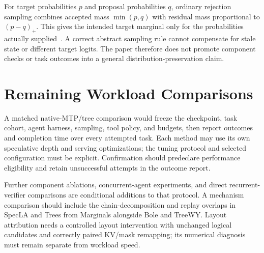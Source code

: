 \documentclass[conference]{IEEEtran}
\begin{document}
For target probabilities $p$ and proposal probabilities $q$, ordinary rejection sampling combines accepted mass $\min(p,q)$ with residual mass proportional to $(p-q)_+$. This gives the intended target marginal only for the probabilities actually supplied~\cite{leviathan2023fast,chen2023sampling}. A correct abstract sampling rule cannot compensate for stale state or different target logits. The paper therefore does not promote component checks or task outcomes into a general distribution-preservation claim.

\section{Remaining Workload Comparisons}
\label{app:validation}
A matched native-MTP/tree comparison would freeze the checkpoint, task cohort, agent harness, sampling, tool policy, and budgets, then report outcomes and completion time over every attempted task. Each method may use its own speculative depth and serving optimizations; the tuning protocol and selected configuration must be explicit. Confirmation should predeclare performance eligibility and retain unsuccessful attempts in the outcome report.

Further component ablations, concurrent-agent experiments, and direct recurrent-verifier comparisons are conditional additions to that protocol. A mechanism comparison should include the chain-decomposition and replay overlaps in SpecLA and Trees from Marginals alongside Bole and TreeWY. Layout attribution needs a controlled layout intervention with unchanged logical candidates and correctly paired KV/mask remapping; its numerical diagnosis must remain separate from workload speed.

\label{ReferencesStart}


\end{document}
